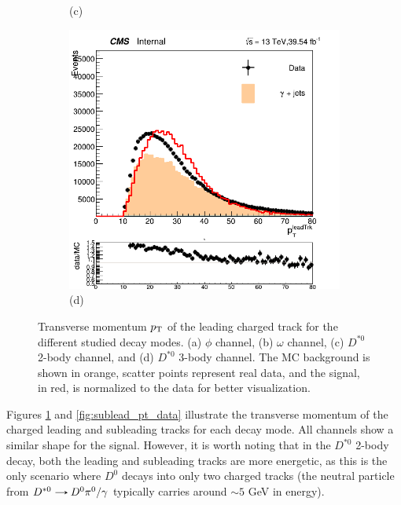 \begin{figure}[!ht]
\begin{subfigure}[t]{0.50\mylength}
        \caption{\footnotesize (c)}
    \end{subfigure}%
    \begin{subfigure}[t]{0.50\mylength}
        \centering
        \includegraphics[width=0.45\mylength]{resources/plots/D0Star_3body_lead_pt.png}
        \caption{\footnotesize (d)}
    \end{subfigure}%
\caption{Transverse momentum $p_\text{T}$ of the leading charged track for the different studied decay modes. (a) $\phi$ channel, (b) $\omega$ channel, (c) $D^{*0}$ 2-body channel, and (d) $D^{*0}$ 3-body channel. The MC background is shown in orange, scatter points represent real data, and the signal, in red, is normalized to the data for better visualization.}
\label{fig:lead_pt_data}
    \vspace*{-0.0cm}
\end{figure}

\newpage

Figures \ref{fig:lead_pt_data} and \ref{fig:sublead_pt_data} illustrate the transverse momentum of the charged leading and subleading tracks for each decay mode. All channels show a similar shape for the signal. However, it is worth noting that in the $D^{*0}$ 2-body decay, both the leading and subleading tracks are more energetic, as this is the only scenario where $D^{0}$ decays into only two charged tracks (the neutral particle from $D^{*0}\decaysto D^{0}\pi^{0}/\gamma$ typically carries around $\sim5$ GeV in energy).


